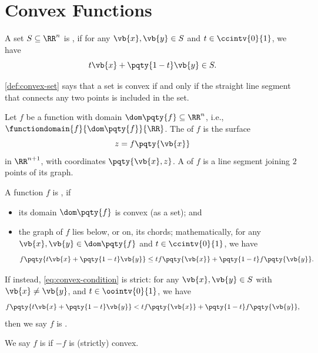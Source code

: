 \section{Convex Functions}

\begin{definition}
    \label{def:convex-set}%
    A set \(S \subseteq \RR^n\) is , if for any \(\vb{x}, \vb{y} \in S\) and \(t \in \ccintv{0}{1}\), we have
    \[
        t \vb{x} + \pqty{1 - t} \vb{y} \in S.
    \]
\end{definition}

\autoref{def:convex-set} says that a set is convex if and only if the straight line segment that connects any two points is included in the set.

\begin{definition}
    \label{def:graph-of-fn}%
    Let \(f\) be a function with domain \(\dom\pqty{f} \subseteq \RR^n\), i.e., \(\functiondomain{f}{\dom\pqty{f}}{\RR}\). The  of \(f\) is the surface
    \[
        z = f\pqty{\vb{x}}
    \]
    in \(\RR^{n + 1}\), with coordinates \(\pqty{\vb{x}, z}\). A  of \(f\) is a line segment joining \(2\) points of its graph.
\end{definition}

\begin{definition}
    \label{def:convex-function}%
    A function \(f\) is , if
    \begin{itemize}
        \item its domain \(\dom\pqty{f}\) is convex (as a set); and
        \item the graph of \(f\) lies below, or on, its chords; mathematically, for any \(\vb{x}, \vb{y} \in \dom\pqty{f}\) and \(t \in \ccintv{0}{1}\), we have
        \begin{equation}
            f\pqty{t \vb{x} + \pqty{1 - t} \vb{y}} \leq t f\pqty{\vb{x}} + \pqty{1 - t} f\pqty{\vb{y}}. \label{eq:convex-condition}
        \end{equation}
    \end{itemize}

    If instead, \eqref{eq:convex-condition} is strict: for any \(\vb{x}, \vb{y} \in S\) with \(\vb{x} \neq \vb{y}\), and \(t \in \oointv{0}{1}\), we have
    \begin{equation}
        f\pqty{t \vb{x} + \pqty{1 - t} \vb{y}} < t f\pqty{\vb{x}} + \pqty{1 - t} f\pqty{\vb{y}}, \label{eq:strict-convex-condition}
    \end{equation}
    then we say \(f\) is .

    We say \(f\) is  if \(-f\) is (strictly) convex.
\end{definition}

